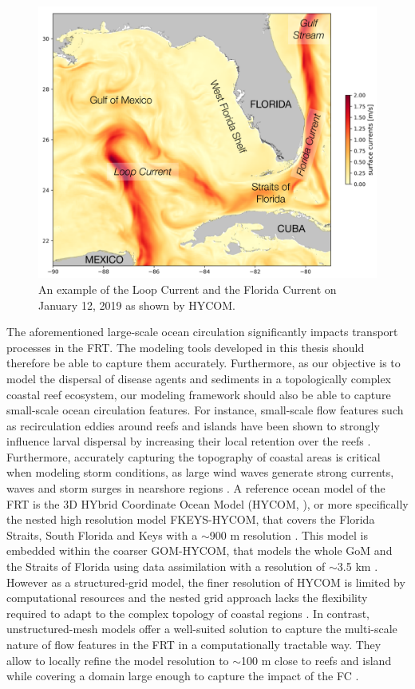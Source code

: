 \begin{figure}
	\centering
	\includegraphics[width=.9\textwidth]{chapters/intro/figures/fig_gom.png}
	\caption{An example of the Loop Current and the Florida Current on January 12, 2019 as shown by HYCOM.}
	\label{intro:gom}
\end{figure}

The aforementioned large-scale ocean circulation significantly impacts transport processes in the FRT. The modeling tools developed in this thesis should therefore be able to capture them accurately. Furthermore, as our objective is to model the dispersal of disease agents and sediments in a topologically complex coastal reef ecosystem, our modeling framework should also be able to capture small-scale ocean circulation features. For instance, small-scale flow features such as recirculation eddies around reefs and islands have been shown to strongly influence larval dispersal by increasing their local retention over the reefs \citep{figueiredo2013synthesizing}. Furthermore, accurately capturing the topography of coastal areas is critical when modeling storm conditions, as large wind waves generate strong currents, waves and storm surges in nearshore regions \citep{dietrich2010high, weisberg2006hurricane}. A reference ocean model of the FRT is the 3D HYbrid Coordinate Ocean Model (HYCOM, \citealp{chassignet2007hycom}), or more specifically the nested high resolution model FKEYS-HYCOM, that covers the Florida Straits, South Florida and Keys with a $\sim$900 m resolution \citep{kourafalou2012florida}. This model is embedded within the coarser GOM-HYCOM, that models the whole GoM and the Straits of Florida using data assimilation with a resolution of $\sim$3.5 km \citep{cummings2005operational,prasad2007upper}. However as a structured-grid model, the finer resolution of HYCOM is limited by computational resources and the nested grid approach lacks the flexibility required to adapt to the complex topology of coastal regions \citep{fringer2019future}. In contrast, unstructured-mesh models offer a well-suited solution to capture the multi-scale nature of flow features in the FRT in a computationally tractable way. They allow to locally refine the model resolution to $\sim$100 m close to reefs and island while covering a domain large enough to capture the impact of the FC \citep{lambrechts2008multi,frys2020fine}.


